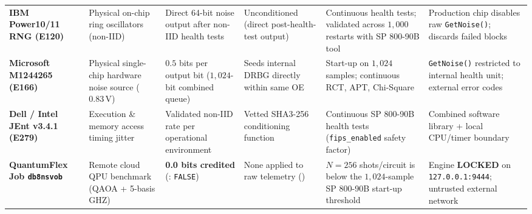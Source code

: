 \documentclass[10pt,letterpaper]{article}
\begin{document}
\begin{minipage}{\textwidth}
\begin{tabularx}{\textwidth}{L{2.3cm} L{2.5cm} L{2.5cm} L{2.4cm} Y L{2.5cm}}
\textbf{IBM Power10/11 RNG (E120)}~\cite{nist_e120} & Physical on-chip ring oscillators (non-IID) & Direct 64-bit noise output after non-IID health tests & Unconditioned (direct post-health-test output) & Continuous health tests; validated across $1{,}000$ restarts with SP 800-90B tool & Production chip disables raw \texttt{GetNoise()}; discards failed blocks \\
\textbf{Microsoft M1244265 (E166)}~\cite{nist_e166} & Physical single-chip hardware noise source ($0.83\,\text{V}$) & $0.5$ bits per output bit ($1{,}024$-bit combined queue) & Seeds internal DRBG directly within same OE & Start-up on $1{,}024$ samples; continuous RCT, APT, Chi-Square & \texttt{GetNoise()} restricted to internal health unit; external error codes \\
\textbf{Dell / Intel JEnt v3.4.1 (E279)}~\cite{nist_e279} & Execution \& memory access timing jitter & Validated non-IID rate per operational environment & Vetted SHA3-256 conditioning function & Continuous SP 800-90B health tests (\texttt{fips\_enabled} safety factor) & Combined software library + local CPU/timer boundary \\
\textbf{QuantumFlex Job \texttt{db8nsvob}}~\cite{qfx_doc} & Remote cloud QPU benchmark (QAOA + 5-basis GHZ) & \textbf{0.0 bits credited} (: \texttt{FALSE}) & None applied to raw telemetry () & $N = 256$ shots/circuit is below the $1{,}024$-sample SP 800-90B start-up threshold & Engine \textbf{LOCKED} on \texttt{127.0.0.1:9444}; untrusted external network~\cite{nist_sp800_121,nist_sp800_52} \\
\bottomrule
\end{tabularx}
\end{minipage}\vspace{6pt}
\end{document}

